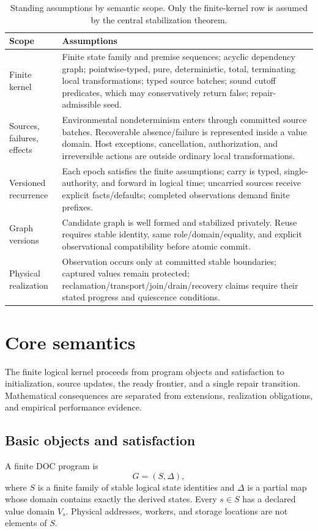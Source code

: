 \begin{table}[t]
\centering\scriptsize
\caption{Standing assumptions by semantic scope. Only the finite-kernel row is assumed by the central stabilization theorem.}\label{tab:assumptions}
\begin{tabularx}{\textwidth}{@{}p{}X@{}}
\toprule Scope & Assumptions\\ \midrule
Finite kernel & Finite state family and premise sequences; acyclic dependency graph; pointwise-typed, pure, deterministic, total, terminating local transformations; typed source batches; sound cutoff predicates, which may conservatively return false; repair-admissible seed.\\
Sources, failures, effects & Environmental nondeterminism enters through committed source batches. Recoverable absence/failure is represented inside a value domain. Host exceptions, cancellation, authorization, and irreversible actions are outside ordinary local transformations.\\
Versioned recurrence & Each epoch satisfies the finite assumptions; carry is typed, single-authority, and forward in logical time; uncarried sources receive explicit facts/defaults; completed observations demand finite prefixes.\\
Graph versions & Candidate graph is well formed and stabilized privately. Reuse requires stable identity, same role/domain/equality, and explicit observational compatibility before atomic commit.\\
Physical realization & Observation occurs only at committed stable boundaries; captured values remain protected; reclamation/transport/join/drain/recovery claims require their stated progress and quiescence conditions.\\ \bottomrule
\end{tabularx}
\end{table}

\section{Core semantics}\label{sec:core}
The finite logical kernel proceeds from program objects and satisfaction to initialization, source updates, the ready frontier, and a single repair transition. Mathematical consequences are separated from extensions, realization obligations, and empirical performance evidence.

\subsection{Basic objects and satisfaction}
A finite DOC program is
\begin{equation}G=(S,\Delta),\label{eq:program}\end{equation}
where $S$ is a finite family of stable logical state identities and $\Delta$ is a partial map whose domain contains exactly the derived states. Every $s\in S$ has a declared value domain $V_s$. Physical addresses, workers, and storage locations are not elements of $S$.

